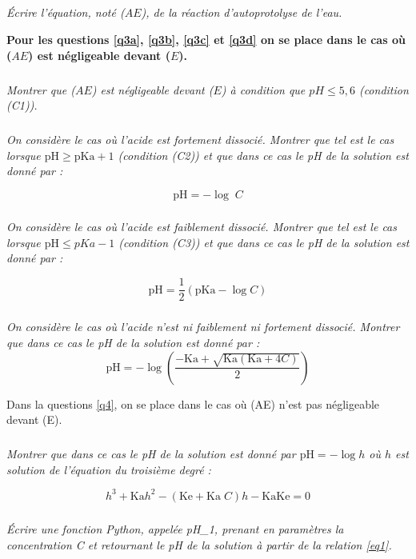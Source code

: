 \documentclass[10pt,oneside]{article}
\begin{document}
\subparagraph{\label{q2}}
\textit{Écrire l’équation, noté ($AE$), de la réaction d’autoprotolyse de l’eau.}

\vspace{.5cm}

\textbf{Pour les questions \ref{q3a}, \ref{q3b}, \ref{q3c} et \ref{q3d} on se place dans le cas où ($AE$) est négligeable devant ($E$).}

\subparagraph{\label{q3a}}
\textit{Montrer que ($AE$) est négligeable devant ($E$) à condition que $pH \leq 5,6$ (condition (C1)).}

\subparagraph{\label{q3b}}
\textit{On considère le cas où l’acide est fortement dissocié. Montrer que tel est le cas lorsque 
$\text{pH} \geq \text{pKa} +1$ (condition (C2)) et que dans ce cas le pH de la solution est donné par : }

\begin{equation} \label{eq1}
\text{pH}= -\log\; C 
\end{equation}


\subparagraph{\label{q3c}}
\textit{On considère le cas où l’acide est faiblement dissocié. Montrer que tel est le cas lorsque 
$\text{pH} \leq pKa -1$ (condition (C3)) et que dans ce cas le pH de la solution est donné par : }

\begin{equation} \label{eq2}
\text{pH} = \dfrac{1}{2} \left(\text{pKa}- \log C \right)
\end{equation}

\subparagraph{\label{q3d}}
\textit{On considère le cas où l’acide n’est ni faiblement ni fortement dissocié. Montrer que dans ce cas 
le pH de la solution est donné par :}
\begin{equation} \label{eq3}
\text{pH} = - \log \left( \dfrac{-\text{Ka} + \sqrt{\text{Ka}\left( \text{Ka} + 4C\right)}}{2}\right)
\end{equation}


Dans la questions \ref{q4},
 on se place dans le cas où (AE) n’est pas négligeable devant (E). 
\subparagraph{\label{q4}}
\textit{Montrer que dans ce cas le pH de la solution est donné par $\text{pH} = - \log h$ où $h$ est solution de l’équation 
du troisième degré :}

\begin{equation} \label{eq4}
h^3 + \text{Ka}h^2 - \left(\text{Ke} + \text{Ka}\; C\right)h - \text{Ka} \text{Ke} = 0
\end{equation}


\subparagraph{\label{q5a}}
\textit{ Écrire une fonction Python, appelée pH\_1, prenant en paramètres la concentration C et retournant 
le pH de la solution à partir de la relation \eqref{eq1}. }
\end{document}
